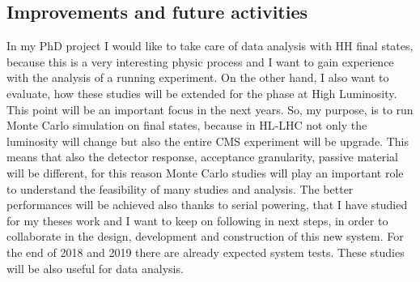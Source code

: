 \documentclass[a4paper,12pt,italian]{article}
\begin{document}
\subsection*{Improvements and future activities}
In my PhD project I would like to take care of data analysis with HH final states, because this is a very interesting physic process and I want to gain experience with the analysis of a running experiment. 
On the other hand, I also want to evaluate, how these studies will be extended for the phase at High Luminosity. This point will be an important  focus in the next years. So, my purpose, is to run Monte Carlo simulation on final states, because in HL-LHC not only the luminosity will change but also the entire CMS experiment will be upgrade. This means that also the detector response, acceptance granularity, passive material will be different, for this reason Monte Carlo studies will play an important role to understand the feasibility of many studies and analysis.  
The better performances will be achieved also thanks to serial powering, that I have studied for my theses work and I want to keep on following in next steps, in order to collaborate in the design, development and construction of this new system. For the end of 2018 and 2019 there are already expected system tests. These studies will be also useful for data analysis.
\end{document}
